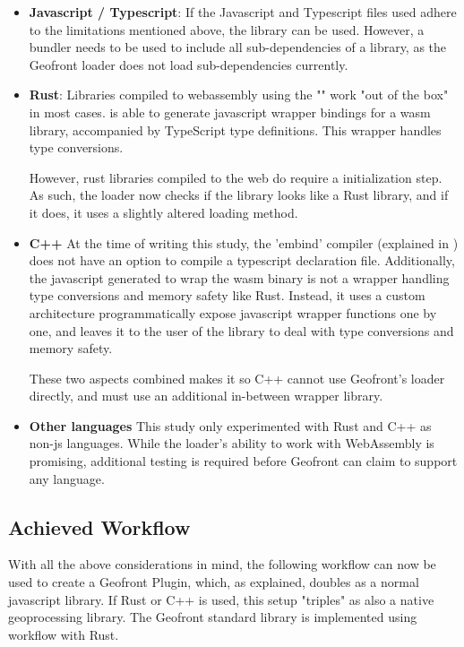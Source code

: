 \begin{itemize}[-]
  \item \textbf{Javascript / Typescript}: 
    If the Javascript and Typescript files used adhere to the limitations mentioned above, the library can be used. 
    However, a bundler needs to be used to include all sub-dependencies of a library, as the Geofront loader does not load sub-dependencies currently. 

  \item \textbf{Rust}:
    Libraries compiled to webassembly using the "" work "out of the box" in most cases.
     is able to generate javascript wrapper bindings for a \ac{wasm} library, accompanied by TypeScript type definitions. 
    This wrapper handles type conversions. 
    
    However, rust libraries compiled to the web do require a initialization step. 
    As such, the loader now checks if the library looks like a Rust library, and if it does, it uses a slightly altered loading method.
  \item \textbf{C++}
    At the time of writing this study, the 'embind' compiler (explained in ) does not have an option to compile a typescript declaration file. 
    Additionally, the javascript generated to wrap the wasm binary is not a wrapper handling type conversions and memory safety like Rust. 
    Instead, it uses a custom architecture programmatically expose javascript wrapper functions one by one, and leaves it to the user of the library to deal with type conversions and memory safety. 
    
    These two aspects combined makes it so C++ cannot use Geofront's loader directly, and must use an additional in-between wrapper library.

  \item \textbf{Other languages}
    This study only experimented with Rust and C++ as non-js languages.
    While the loader's ability to work with WebAssembly is promising, additional testing is required before Geofront can claim to support any language. 
\end{itemize}

\subsection{Achieved Workflow}

With all the above considerations in mind, the following workflow can now be used to create a Geofront Plugin, which, as explained, doubles as a normal javascript library. 
If Rust or C++ is used, this setup "triples" as also a native geoprocessing library.
The Geofront standard library is implemented using workflow with Rust.

